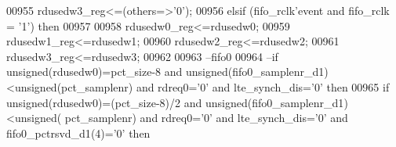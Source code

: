 \begin{DoxyCode}
00955           \textcolor{vhdlchar}{rdusedw3_reg}\textcolor{vhdlchar}{<=}\textcolor{vhdlchar}{(}\textcolor{keywordflow}{others}\textcolor{vhdlchar}{=}\textcolor{vhdlchar}{>}\textcolor{vhdlchar}{'}\textcolor{vhdllogic}{}\textcolor{vhdllogic}{0}\textcolor{vhdlchar}{'}\textcolor{vhdlchar}{)};
00956         \textcolor{keywordflow}{elsif} \textcolor{vhdlchar}{(}\textcolor{vhdlchar}{fifo_rclk}\textcolor{vhdlchar}{'}\textcolor{vhdlkeyword}{event} \textcolor{keywordflow}{and} \textcolor{vhdlchar}{fifo_rclk} \textcolor{vhdlchar}{=} \textcolor{vhdlchar}{'}\textcolor{vhdllogic}{}\textcolor{vhdllogic}{1}\textcolor{vhdlchar}{'}\textcolor{vhdlchar}{)} \textcolor{keywordflow}{then}
00957 
00958          \textcolor{vhdlchar}{rdusedw0_reg}\textcolor{vhdlchar}{<=}\textcolor{vhdlchar}{rdusedw0};
00959         \textcolor{vhdlchar}{rdusedw1_reg}\textcolor{vhdlchar}{<=}\textcolor{vhdlchar}{rdusedw1};
00960         \textcolor{vhdlchar}{rdusedw2_reg}\textcolor{vhdlchar}{<=}\textcolor{vhdlchar}{rdusedw2};
00961           \textcolor{vhdlchar}{rdusedw3_reg}\textcolor{vhdlchar}{<=}\textcolor{vhdlchar}{rdusedw3};
00962          
00963 \textcolor{keyword}{            --fifo0}
00964 \textcolor{keyword}{          --if unsigned(rdusedw0)=pct\_size-8 and unsigned(fifo0\_samplenr\_d1)<unsigned(pct\_samplenr) and
       rdreq0='0' and lte\_synch\_dis='0' then }
00965            \textcolor{keywordflow}{if} \textcolor{comment}{unsigned}\textcolor{vhdlchar}{(}\textcolor{vhdlchar}{rdusedw0}\textcolor{vhdlchar}{)}\textcolor{vhdlchar}{=}\textcolor{vhdlchar}{(}\textcolor{vhdlchar}{pct_size}\textcolor{vhdlchar}{-}\textcolor{vhdllogic}{}\textcolor{vhdllogic}{8}\textcolor{vhdlchar}{)}\textcolor{vhdlchar}{/}\textcolor{vhdllogic}{}\textcolor{vhdllogic}{2} \textcolor{keywordflow}{and} \textcolor{comment}{unsigned}\textcolor{vhdlchar}{(}\textcolor{vhdlchar}{fifo0_samplenr_d1}\textcolor{vhdlchar}{)}\textcolor{vhdlchar}{<}\textcolor{comment}{unsigned}\textcolor{vhdlchar}{(}\textcolor{vhdlchar}{
      pct_samplenr}\textcolor{vhdlchar}{)} \textcolor{keywordflow}{and} \textcolor{vhdlchar}{rdreq0}\textcolor{vhdlchar}{=}\textcolor{vhdlchar}{'}\textcolor{vhdllogic}{}\textcolor{vhdllogic}{0}\textcolor{vhdlchar}{'} \textcolor{keywordflow}{and} \textcolor{vhdlchar}{lte_synch_dis}\textcolor{vhdlchar}{=}\textcolor{vhdlchar}{'}\textcolor{vhdllogic}{}\textcolor{vhdllogic}{0}\textcolor{vhdlchar}{'} \textcolor{keywordflow}{and} \textcolor{vhdlchar}{fifo0_pctrsvd_d1}\textcolor{vhdlchar}{(}\textcolor{vhdllogic}{}\textcolor{vhdllogic}{4}\textcolor{vhdlchar}{)}\textcolor{vhdlchar}{=}\textcolor{vhdlchar}{'}\textcolor{vhdllogic}{}\textcolor{vhdllogic}{0}\textcolor{vhdlchar}{'} \textcolor{keywordflow}{then}   

\end{DoxyCode}
